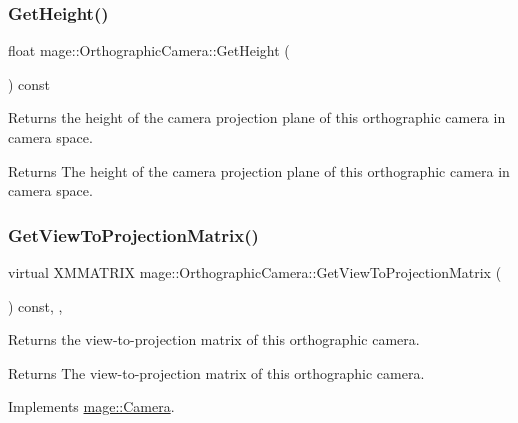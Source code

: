 \subsubsection{\texorpdfstring{Get\+Height()}{GetHeight()}}
{\footnotesize\ttfamily float mage\+::\+Orthographic\+Camera\+::\+Get\+Height (\begin{DoxyParamCaption}{ }\end{DoxyParamCaption}) const\hspace{0.3cm}{\ttfamily [noexcept]}}

Returns the height of the camera projection plane of this orthographic camera in camera space.

\begin{DoxyReturn}{Returns}
The height of the camera projection plane of this orthographic camera in camera space. 
\end{DoxyReturn}
\hypertarget{classmage_1_1_orthographic_camera_a970dc089a2463d74ae186884fa2b9b0c}{}\label{classmage_1_1_orthographic_camera_a970dc089a2463d74ae186884fa2b9b0c} 
\subsubsection{\texorpdfstring{Get\+View\+To\+Projection\+Matrix()}{GetViewToProjectionMatrix()}}
{\footnotesize\ttfamily virtual X\+M\+M\+A\+T\+R\+IX mage\+::\+Orthographic\+Camera\+::\+Get\+View\+To\+Projection\+Matrix (\begin{DoxyParamCaption}{ }\end{DoxyParamCaption}) const\hspace{0.3cm}{\ttfamily [override]}, {\ttfamily [virtual]}, {\ttfamily [noexcept]}}

Returns the view-\/to-\/projection matrix of this orthographic camera.

\begin{DoxyReturn}{Returns}
The view-\/to-\/projection matrix of this orthographic camera. 
\end{DoxyReturn}


Implements \hyperlink{classmage_1_1_camera_ad72020c0bd6f8629bf8c8ba8bf583ed4}{mage\+::\+Camera}.

\hypertarget{classmage_1_1_orthographic_camera_ab3c2878e9c06b38b442eb7b1fa00ec78}{}\label{classmage_1_1_orthographic_camera_ab3c2878e9c06b38b442eb7b1fa00ec78} 
